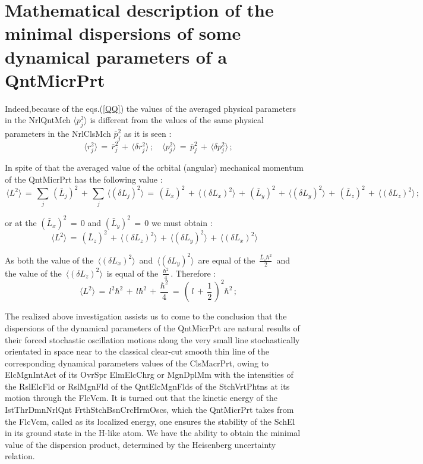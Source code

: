 \documentclass[12pt]{article}
\begin{document}
\section{ Mathematical description of the minimal dispersions of some
dynamical parameters of a QntMicrPrt}

 Indeed,because of the eqs.(\ref{QQ}) the values of the averaged physical
parameters in the NrlQntMch $\langle p_j^2 \rangle$ is different from the
values of the same physical parameters in the NrlClsMch $\bar{p}_j^2$ as it
is seen :
\begin{equation}\label{RR}
\quad\langle{r}_j^2\rangle\,=\,{\bar r}_j^2\,+\,\langle\delta{r}_j^2\rangle\,;
\quad\langle{p}_j^2\rangle\,=\,\bar{p}_j^2\,+\,\langle\delta{p}_j^2\rangle\,;
\end{equation}

 In spite of that the averaged value of the orbital (angular) mechanical
momentum of the QntMicrPrt has the following value :
\begin{equation}\label{SS}
\,\langle L^2\rangle\,=\,\sum_j\,(\bar{L}_j)^2\,+
\,\sum_j\,\langle(\delta{L}_j)^2\rangle\,=
\,(\bar{L}_x)^2\,+\,\langle(\delta{L}_x)^2\rangle\,+
\,(\bar{L}_y)^2\,+\,\langle(\delta{L}_y)^2\rangle\,+
\,(\bar{L}_z)^2\,+\,\langle(\delta{L}_z)^2\rangle\,;
\end{equation}

or at the $(\bar{L}_x)^2\,=\,0$ and $(\bar{L}_y)^2\,=\,0$ we must obtain :
\begin{equation}\label{TT}
\,\langle L^2\rangle\,=
\,(\bar{L}_z)^2\,+\,\langle(\delta{L}_z)^2\rangle\,+
\,\langle(\delta{L}_y)^2\rangle\,+\,\langle(\delta{L}_x)^2\rangle\,
\end{equation}

  As both the value of the $\,\langle(\delta{L}_x)^2\rangle\,$ and
$\,\langle(\delta{L}_y)^2\rangle\,$ are equal of the
$\,\frac{\bar{L}_z\hbar^2}{2}\,$ and the value of the
$\,\langle(\delta{L}_z)^2\rangle\,$ is equal of the
$\,\frac{\hbar^2}{4}\,$. Therefore :
\begin{equation}\label{UU}
\quad\langle L^2\rangle\,=\,l^2\hbar^2\,+\,l\hbar^2\,+
\,\frac{\hbar^2}{4}\,=\,(\,l\,+\,\frac{1}{2}\,)^2\hbar^2\,;
\end{equation}

 The realized above investigation assists us to come to the conclusion that
the dispersions of the dynamical parameters of the QntMicrPrt are natural
results of their forced stochastic oscillation motions along the very small
line stochastically orientated in space near to the classical clear-cut
smooth thin line of the corresponding dynamical parameters values of the
ClsMacrPrt, owing to ElcMgnIntAct of its OvrSpr ElmElcChrg or MgnDplMm with
the intensities of the RslElcFld or RslMgnFld of the QntElcMgnFlds of the
StchVrtPhtns at its motion through the FlcVcm.  It is turned out that the
kinetic energy of the IstThrDmnNrlQnt FrthStchBsnCrcHrmOscs, which the
QntMicrPrt takes from the FlcVcm, called as its localized energy, one
ensures the stability of the SchEl in its ground state in the H-like atom.
We have the ability to obtain the minimal value of the dispersion product,
determined by the Heisenberg uncertainty relation.
\end{document}
